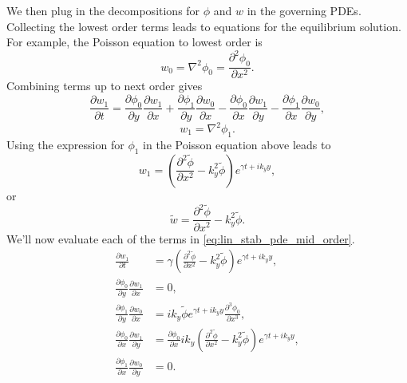 \documentclass[oneside,a4paper,11pt]{report}
\begin{document}
We then plug in the decompositions for $\phi$ and $w$ in the governing PDEs. Collecting the lowest order terms leads to equations for the equilibrium solution. For example, the Poisson equation to lowest order is
\begin{equation}
    \label{eq:lin_stab_w0_phi0}
    w_0 = \nabla^2 \phi_0 = \frac{\partial^2 \phi_0}{\partial x^2}.
\end{equation}
Combining terms up to next order gives
\begin{equation}
    \label{eq:lin_stab_pde_mid_order}
    \frac{\partial w_1}{\partial t} = \frac{\partial \phi_0}{\partial y}\frac{\partial w_1}{\partial x} + \frac{\partial \phi_1}{\partial y}\frac{\partial w_0}{\partial x} - \frac{\partial \phi_0}{\partial x} \frac{\partial w_1}{\partial y} - \frac{\partial \phi_1}{\partial x} \frac{\partial w_0}{\partial y},
\end{equation}
\begin{equation}
    w_1 = \nabla^2 \phi_1.
\end{equation}
Using the expression for $\phi_1$ in the Poisson equation above leads to 
\begin{equation}
    w_1 = \left ( \frac{\partial^2 \tilde{\phi}}{\partial x^2} - k_y^2 \tilde{\phi} \right ) e^{\gamma t + i k_y y},
\end{equation}
or 
\begin{equation}
    \tilde{w} = \frac{\partial^2 \tilde{\phi}}{\partial x^2} - k_y^2 \tilde{\phi} .
\end{equation}
We'll now evaluate each of the terms in \cref{eq:lin_stab_pde_mid_order}.
\begin{align}
    \frac{\partial w_1}{\partial t} &= \gamma \left ( \frac{\partial^2 \tilde{\phi}}{\partial x^2} - k_y^2 \tilde{\phi} \right ) e^{\gamma t + i k_y y}, \nonumber \\
    \frac{\partial \phi_0}{\partial y}\frac{\partial w_1}{\partial x} &= 0, \nonumber \\
    \frac{\partial \phi_1}{\partial y}\frac{\partial w_0}{\partial x} &= i k_y \tilde{\phi} e^{\gamma t + i k_y y} \frac{\partial^3 \phi_0}{\partial x^3}, \nonumber \\
    \frac{\partial \phi_0}{\partial x} \frac{\partial w_1}{\partial y} &= \frac{\partial \phi_0}{\partial x} i k_y \left ( \frac{\partial^2 \tilde{\phi}}{\partial x^2} - k_y^2 \tilde{\phi} \right ) e^{\gamma t + i k_y y},\nonumber \\
    \frac{\partial \phi_1}{\partial x} \frac{\partial w_0}{\partial y} &= 0 . \nonumber \\
\end{align}
\end{document}
